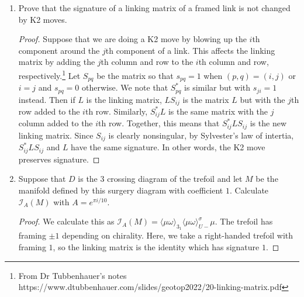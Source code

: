 \documentclass{article}
\def\cI{\mathcal{I}}
\begin{document}
\begin{enumerate}
\begin{proof}
      This means that interchanging $x$ and $y$ does not change the number of closed curves of the diagram, and so it does not change the trace. It remains to show that the trace is nondegenerate when $A$ is not a root of unity.\smallskip

      This is equivalent to showing that the Kauffman bracket is nonvanishing. But, as Lickorish notes, every diagram is a multiple of the empty diagram, and none of the terms can vanish if $A$ is not a root of unity. Therefore the Kauffman bracket is nonvanishing as well, so the form is nondegenerate. 
    \end{proof}
    \item Prove that the signature of a linking matrix of a framed link is not changed by K2 moves.
    \begin{proof}
      Suppose that we are doing a K2 move by blowing up the $i$th component around the $j$th component of a link. This affects the linking matrix by adding the $j$th column and row to the $i$th column and row, respectively.\footnote{From Dr Tubbenhauer's notes https://www.dtubbenhauer.com/slides/geotop2022/20-linking-matrix.pdf} Let $S_{pq}$ be the matrix so that $s_{pq} = 1$ when $(p,q) =(i,j)$ or $i=j$ and $s_{pq} = 0$ otherwise. We note that $S^*_{pq}$ is similar but with $s_{ji} =1$ instead. Then if $L$ is the linking matrix, $LS_{ij}$ is the matrix $L$ but with the $j$th row added to the $i$th row. Similarly, $S_{ij}^*L$ is the same matrix with the $j$ column added to the $i$th row. Together, this means that $S_{ij}^*LS_{ij}$ is the new linking matrix. Since $S_{ij}$ is clearly nonsingular, by Sylvester's law of intertia, $S_{ij}^*LS_{ij}$ and $L$ have the same signature. In other words, the K2 move preserves signature. 
    \end{proof}
    \item Suppose that $D$ is the 3 crossing diagram of the trefoil and let $M$ be the manifold defined by this surgery diagram with coefficient $1.$ Calculate $\cI_A(M)$ with $A = e^{\pi i/10}.$
      \begin{proof}
      We calculate this as $\cI_A(M) = \langle\mu\omega\rangle_{3_1}\langle\mu\omega\rangle_{U-}^\sigma\mu.$ The trefoil has framing $\pm 1$ depending on chirality. Here, we take a right-handed trefoil with framing $1$, so the linking matrix is the identity which has signature $1.$\smallskip


\end{proof}
\end{enumerate}
\end{document}
